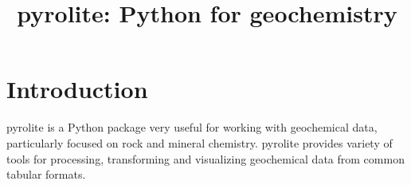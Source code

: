\documentclass[]{article}
\title{pyrolite: Python for geochemistry}
\begin{document}
\maketitle
\section{Introduction}
pyrolite is a Python package very useful for  working with geochemical data, particularly focused on rock and mineral chemistry. pyrolite provides variety of tools for processing, transforming and visualizing geochemical data from common tabular formats.
\end{document}
